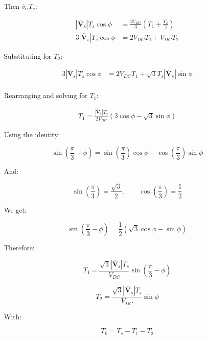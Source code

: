 \documentclass{article}
\begin{document}
Then $\overline{v}_\alpha T_s$:

\begin{align}
    |\overline{\mathbf{V}}_s|T_s\cos\phi &= \frac{2V_{DC}}{3}(T_1 + \frac{T_2}{2}) \\
    3|\overline{\mathbf{V}}_s|T_s\cos\phi &= 2V_{DC}T_1 + V_{DC}T_2
\end{align}

Substituting for $T_2$:

\begin{align}
    3|\overline{\mathbf{V}}_s|T_s\cos\phi &= 2V_{DC}T_1 + \sqrt{3}T_s|\overline{\mathbf{V}}_s|\sin\phi \\
\end{align}

Rearranging and solving for $T_1$:

\begin{align}
    T_1 = \frac{|\overline{\mathbf{V}}_s|T_s}{2V_{DC}}(3\cos\phi - \sqrt{3}\sin\phi)
\end{align}

Using the identity:

\begin{equation}
    \sin(\frac{\pi}{3} - \phi) = \sin(\frac{\pi}{3})\cos\phi - \cos(\frac{\pi}{3})\sin\phi
\end{equation}

And:

\begin{equation}
    \sin(\frac{\pi}{3}) = \frac{\sqrt{3}}{2}, \qquad
    \cos(\frac{\pi}{3}) = \frac{1}{2}
\end{equation}

We get:

\begin{equation}
    \sin(\frac{\pi}{3} - \phi) = \frac{1}{2}(\sqrt{3}\cos\phi - \sin\phi)
\end{equation}

Therefore:

\begin{equation}
    \boxed{
    T_1 = \frac{\sqrt{3}|\overline{\mathbf{V}}_s|T_s}{V_{DC}}\sin(\frac{\pi}{3} - \phi)
    }
\end{equation}

\begin{equation}
    \boxed{
    T_2 = \frac{\sqrt{3}|\overline{\mathbf{V}}_s|T_s}{V_{DC}}\sin\phi
    }
\end{equation}

With:

\begin{equation}
    \boxed{
        T_0 = T_s - T_1 - T_2
    }
\end{equation}
\end{document}
